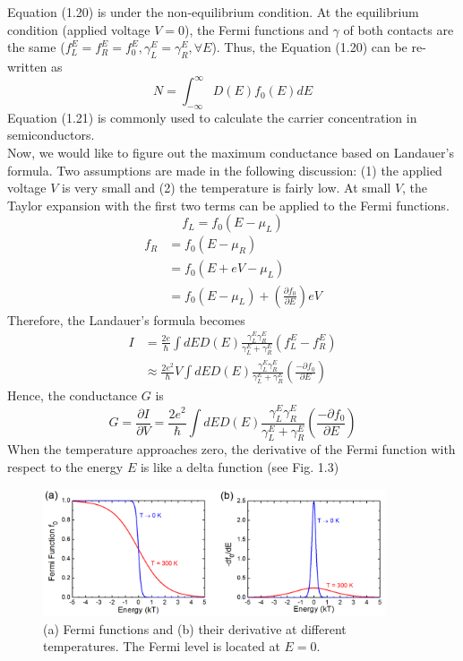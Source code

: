 Equation (1.20) is under the non-equilibrium condition. At the equilibrium condition (applied voltage $V = 0$), the Fermi functions and $\gamma$ of both contacts are the same ($f^E_{L} = f^E_{R} = f^E_{0}, \gamma^E_{L} = \gamma^E_{R}, \forall E$). Thus, the Equation (1.20) can be re-written as 
\begin{equation}
N = \int_{-\infty}^{\infty} D\left(E\right) f_{0}\left(E\right)dE
\end{equation} 
Equation (1.21) is commonly used to calculate the carrier concentration in semiconductors.\\
Now, we would like to figure out the maximum conductance based on Landauer's formula. Two assumptions are made in the following discussion: (1) the applied voltage $V$ is very small and (2) the temperature is fairly low. At small $V$, the Taylor expansion with the first two terms can be applied to the Fermi functions. 
\begin{equation}
    f_{L} = f_{0}\left(E-\mu_{L}\right)
\end{equation} 
\begin{align}
    f_{R}&= f_{0}\left(E-\mu_{R}\right)\nonumber\\
    &= f_{0}\left(E+eV-\mu_{L}\right)\nonumber\\
    &= f_{0}\left(E-\mu_{L}\right)+\left(\frac{\partial f_{0}}{\partial E}\right)eV
\end{align} 
Therefore, the Landauer's formula becomes 
\begin{align}
    I&= \frac{2e}{\hbar}\int dE D\left(E\right) \frac{\gamma^E_{L}\gamma^E_{R}}{\gamma^E_{L}+\gamma^E_{R}} \left(f^E_{L}-f^E_{R}\right)\nonumber\\
    &\approx \frac{2e^{2}}{\hbar}V\int dE D\left(E\right) \frac{\gamma^E_{L}\gamma^E_{R}}{\gamma^E_{L}+\gamma^E_{R}}\left(\frac{-\partial f_{0}}{\partial E}\right)
\end{align} 
Hence, the conductance $G$ is
\begin{equation}
    G = \frac{\partial I}{\partial V} = \frac{2e^{2}}{\hbar}\int dED\left(E\right) \frac{\gamma^E_{L}\gamma^E_{R}}{\gamma^E_{L}+\gamma^E_{R}}\left(\frac{-\partial f_{0}}{\partial E}\right)
\end{equation} 
When the temperature approaches zero, the derivative of the Fermi function with respect to the energy $E$ is like a delta function (see Fig. 1.3) 
\begin{figure}[tbp]
\includegraphics[width=0.9\textwidth]{figures/Fig1_3}
\centering
\caption{\small (a) Fermi functions and (b) their derivative at different temperatures. The Fermi level is located at $E = 0$.}
\end{figure}

